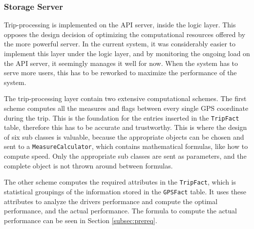 \subsubsection{Storage Server}\label{subsec:impl_storage_server}
Trip-processing is implemented on the API server, inside the logic layer. This opposes the design decision of optimizing the computational resources offered by the more powerful server. In the current system, it was considerably easier to implement this layer under the logic layer, and by monitoring the ongoing load on the API server, it seemingly manages it well for now. When the system has to serve more users, this has to be reworked to maximize the performance of the system. 

The trip-processing layer contain two extensive computational schemes. The first scheme computes all the measures and flags between every single GPS coordinate during the trip. This is the foundation for the entries inserted in the \texttt{TripFact} table, therefore this has to be accurate and trustworthy. This is where the design of six sub classes is valuable, because the appropriate objects can be chosen and sent to a \texttt{MeasureCalculator}, which contains mathematical formulas, like how to compute speed. Only the appropriate sub classes are sent as parameters, and the complete object is not thrown around between formulas.

The other scheme computes the required attributes in the \texttt{TripFact}, which is statistical groupings of the information stored in the \texttt{GPSFact} table. It uses these attributes to analyze the drivers performance and compute the optimal performance, and the actual performance. The formula to compute the actual performance can be seen in Section \ref{subsec:prereq}.
